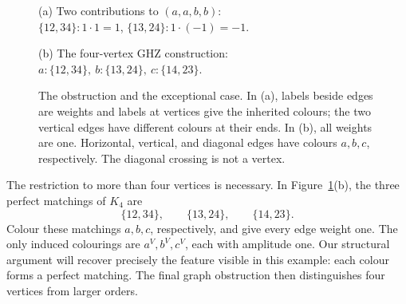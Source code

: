 \documentclass[11pt]{article}
\theoremstyle{definition}
\theoremstyle{plain}
\numberwithin{equation}{section}
\begin{document}
\begin{figure}[htbp]
\centering
\begin{minipage}[t]{0.48\textwidth}
\centering
{}

\small (a) Two contributions to \((a,a,b,b)\):\\
\(\{12,34\}:1\cdot1=1\),
\(\{13,24\}:1\cdot(-1)=-1\).
\end{minipage}\hfill
\begin{minipage}[t]{0.48\textwidth}
\centering
{}

\small (b) The four-vertex GHZ construction:\\
\(a:\{12,34\},\ b:\{13,24\},\ c:\{14,23\}\).
\end{minipage}
\caption{The obstruction and the exceptional case. In (a), labels beside
edges are weights and labels at vertices give the inherited colours; the
two vertical edges have different colours at their ends. In (b), all weights
are one. Horizontal, vertical, and diagonal edges have colours \(a,b,c\),
respectively. The diagonal crossing is not a vertex.}
\label{fig:examples}
\end{figure}

The restriction to more than four vertices is necessary. In
Figure~\ref{fig:examples}(b), the three perfect matchings of \(K_4\) are
\[
 \{12,34\},\qquad \{13,24\},\qquad \{14,23\}.
\]
Colour these matchings \(a,b,c\), respectively, and give every edge weight
one. The only induced colourings are \(a^V,b^V,c^V\), each with amplitude
one. Our structural argument will recover precisely the feature visible in
this example: each colour forms a perfect matching. The final graph
obstruction then distinguishes four vertices from larger orders.
\end{document}
